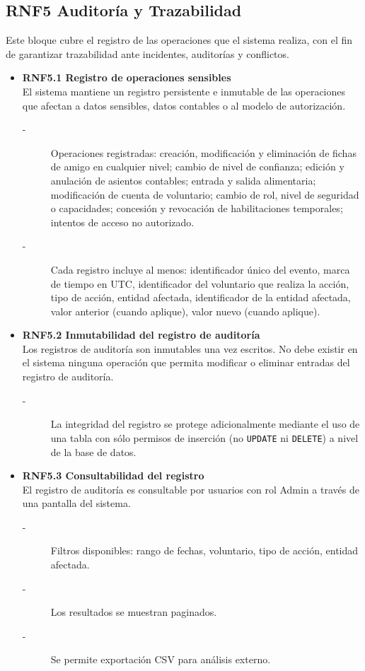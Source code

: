 \subsection{RNF5 Auditoría y Trazabilidad}
Este bloque cubre el registro de las operaciones que el sistema
realiza, con el fin de garantizar trazabilidad ante incidentes,
auditorías y conflictos.
\begin{itemize}
    \item \textbf{RNF5.1 Registro de operaciones sensibles} \\
    El sistema mantiene un registro persistente e inmutable de las
    operaciones que afectan a datos sensibles, datos contables o al
    modelo de autorización.
    \begin{description}
        \item[-] Operaciones registradas: creación, modificación y eliminación de
        fichas de amigo en cualquier nivel; cambio de nivel de confianza;
        edición y anulación de asientos contables; entrada y salida
        alimentaria; modificación de cuenta de voluntario; cambio de
        rol, nivel de seguridad o capacidades; concesión y revocación
        de habilitaciones temporales; intentos de acceso no autorizado. 
        \item[-] Cada registro incluye al menos: identificador único del evento,
        marca de tiempo en UTC, identificador del voluntario que realiza
        la acción, tipo de acción, entidad afectada, identificador de la
        entidad afectada, valor anterior (cuando aplique), valor nuevo
        (cuando aplique).
    \end{description}


    \item \textbf{RNF5.2 Inmutabilidad del registro de auditoría} \\
    Los registros de auditoría son inmutables una vez escritos. No debe existir en el sistema ninguna operación que permita modificar
    o eliminar entradas del registro de auditoría.
    \begin{description}
        \item[-] La integridad del registro se protege adicionalmente mediante el
        uso de una tabla con sólo permisos de inserción (no \texttt{UPDATE} ni
        \texttt{DELETE}) a nivel de la base de datos. 
    \end{description}


    \item \textbf{RNF5.3 Consultabilidad del registro} \\
    El registro de auditoría es consultable por usuarios con rol Admin a
    través de una pantalla del sistema.
    \begin{description}
        \item[-] Filtros disponibles: rango de fechas, voluntario, tipo de acción, entidad afectada.
        \item[-] Los resultados se muestran paginados.
        \item[-] Se permite exportación CSV para análisis externo.  
    \end{description}



\end{itemize}
